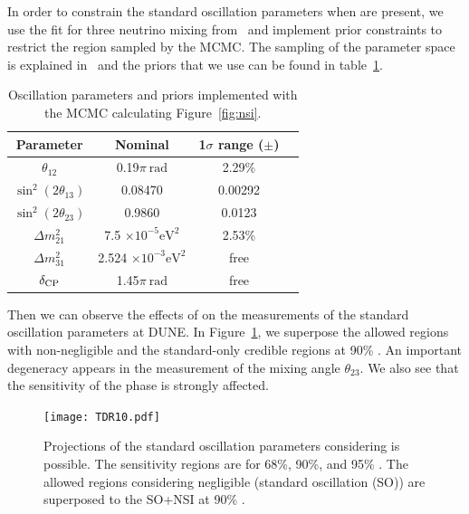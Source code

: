In order to constrain the standard oscillation parameters when   are %
present, we use the fit for three neutrino mixing from~\cite{Gonzalez-Garcia:2013usa} and implement prior constraints to restrict the region sampled by the MCMC. The sampling of the parameter space is explained in~\cite{Coloma:2015kiu} and the priors that we use can be found in table~\ref{tab:priors1}.
\begin{table}[htb]
\caption{Oscillation parameters and priors implemented with the MCMC calculating Figure~\ref{fig:nsi}.} \label{tab:priors1}
\begin{center}
\begin{tabular}{cccc}
\hline
\hline
Parameter&Nominal&1$\sigma$ range ($\pm$)\\ 
\hline
$\theta_{12}$ &0.19$\pi~\textrm{rad}$&2.29\%\\
$\sin^2(2\theta_{13})$ &0.08470&0.00292\\
$\sin^2(2\theta_{23})$ &0.9860&0.0123\\
$\Delta m^2_{21} $ &7.5 $\times10^{-5}\textrm{eV}^2$&2.53\%\\
$\Delta m^2_{31} $ &2.524 $\times10^{-3}\textrm{eV}^2$&free\\
$\delta_{\rm CP} $ &1.45$\pi~\textrm{rad}$&free\\
\hline 
\hline
\end{tabular}
\end{center}
\end{table}

Then we can observe the effects of   on the measurements of the standard oscillation parameters at DUNE. In Figure~\ref{fig:standar-nsi}, we superpose the allowed regions with non-negligible   and the standard-only credible regions at 90\% . %
An important degeneracy appears in the measurement of the mixing angle $\theta_{23}$. We also see that the sensitivity of the  phase is strongly affected.
\begin{figure}[!htb]
	\centering
    \texttt{[image: TDR10.pdf]}
   \caption[Projections of the standard oscillation parameters considering   is possible]{\label{fig:standar-nsi}Projections of the standard oscillation parameters considering   is possible. The sensitivity regions are for 68\%, 90\%, and 95\% . The allowed regions considering negligible   (standard oscillation (SO)) are superposed to the SO+NSI at 90\% .}
\end{figure}

